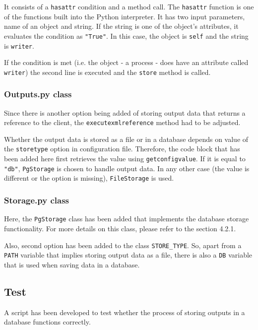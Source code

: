 It consists of a \texttt{hasattr} condition and a method call. The \texttt{hasattr} function is one of the functions built into the Python interpreter. It has two input parameters, name of an object and string. If the string is one of the object's attributes, it evaluates the condition as \texttt{"True"}. \cite{hasattr} In this case, the object is \texttt{self} and the string is \texttt{writer}. 

If the condition is met (i.e. the object - a process - does have an attribute called \texttt{writer}) the second line is executed and the \texttt{store} method is called.

\subsubsection{Outputs.py class}

Since there is another option being added of storing output data that returns a reference to the client, the \texttt{\textunderscore execute\textunderscore xml\textunderscore reference} method had to be adjusted.

Whether the output data is stored as a file or in a database depends on value of the \texttt{store\textunderscore type} option in configuration file. Therefore, the code block that has been added here first retrieves the value using \texttt{get\textunderscore config\textunderscore value}. If it is equal to \texttt{"db"}, \texttt{PgStorage} is chosen to handle output data. In any other case (the value is different or the option is missing), \texttt{FileStorage} is used.

\subsubsection{Storage.py class}

Here, the \texttt{PgStorage} class has been added that implements the database storage functionality. For more details on this class, please refer to the section 4.2.1.

Also, second option has been added to the class \texttt{STORE\_TYPE}. So, apart from a \texttt{PATH} variable that implies storing output data as a file, there is also a \texttt{DB} variable that is used when saving data in a database.

\subsection{Test} 

A script has been developed to test whether the process of storing outputs in a database functions correctly.

